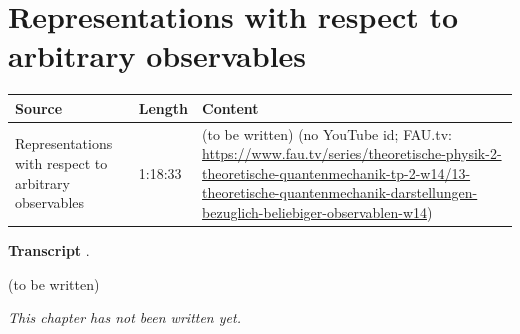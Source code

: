 \chapter{Representations with respect to arbitrary observables}\label{ch:c13}
\begin{paracol}{2}

\begin{sources}
\begin{tabularx}{\linewidth}{@{}l l L@{}}
\toprule
\textbf{Source} & \textbf{Length} & \textbf{Content}\\
\midrule
Representations with respect to arbitrary observables & 1:18:33 & (to be written) (no YouTube id; FAU.tv: \url{https://www.fau.tv/series/theoretische-physik-2-theoretische-quantenmechanik-tp-2-w14/13-theoretische-quantenmechanik-darstellungen-bezuglich-beliebiger-observablen-w14})\\
\bottomrule
\end{tabularx}

\smallskip
\textbf{Transcript} .
\end{sources}

\begin{reading}
(to be written)
\end{reading}

\emph{This chapter has not been written yet.}

\flushside
\end{paracol}
